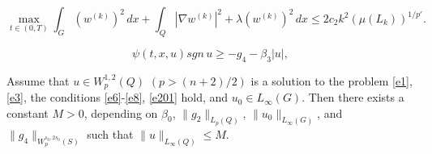 \documentclass[10pt,a4paper]{amsart}
\begin{document}
 \begin{equation}\label{e18}
\max_{t\in (0,T)} \int_{G} (w^{(k)})^2\,dx +
\int_{Q} |\nabla w^{(k)}|^2+ \lambda  (w^{(k)})^2\,dx \leq  2c_2k^2 (\mu(L_k))^{1/p'}.
\end{equation}

\begin{equation}\label{e201}
\psi(t,x,u)sgn\,u\geq -g_4-\beta_3 |u|, 
\end{equation}

\begin{theorem} \label{thr3}
 Assume that  $u\in W_p^{1,2}(Q)$ $(p>(n+2)/2)$ is a solution to the problem  {\rm \eqref{e1}, \eqref{e3}}, the conditions 
   {\rm \eqref{e6}-\eqref{e8}, \eqref{e201}} hold, and    $u_0\in L_\infty(G)$. 
Then there exists a constant  $M>0$, depending on  $\beta_0$,  $\|g_2\|_{L_{p}(Q)}$,  $\|u_0\|_{L_\infty(G)}$, and
$\|g_4\|_{W_p^{s_0,2s_0}(S)}$ such that 
 $\|u\|_{L_\infty(Q)}\leq M$. 
    \end{theorem}
\end{document}
